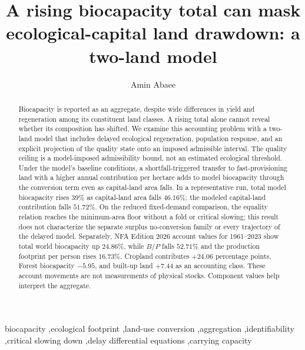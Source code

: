 \documentclass[preprint,12pt,authoryear]{elsarticle}
\begin{document}
\begin{frontmatter}

\title{A rising biocapacity total can mask ecological-capital land drawdown: a two-land model}

\author[1]{Amin Abaee}

\begin{abstract}
Biocapacity is reported as an aggregate, despite wide differences in yield and regeneration among its constituent land classes. A rising total alone cannot reveal whether its composition has shifted. We examine this accounting problem with a two-land model that includes delayed ecological regeneration, population response, and an explicit projection of the quality state onto an imposed admissible interval. The quality ceiling is a model-imposed admissibility bound, not an estimated ecological threshold. Under the model's baseline conditions, a shortfall-triggered transfer to fast-provisioning land with a higher annual contribution per hectare adds to model biocapacity through the conversion term even as capital-land area falls. In a representative run, total model biocapacity rises $39\%$ as capital-land area falls $46.16\%$; the modeled capital-land contribution falls $51.72\%$. On the reduced fixed-demand comparison, the equality relation reaches the minimum-area floor without a fold or critical slowing; this result does not characterize the separate surplus no-conversion family or every trajectory of the delayed model. Separately, NFA Edition 2026 account values for 1961--2023 show total world biocapacity up $24.86\%$, while $B/P$ falls $52.71\%$ and the production footprint per person rises $16.73\%$. Cropland contributes $+24.06$ percentage points, Forest biocapacity $-5.95$, and built-up land $+7.44$ as an accounting class. These account movements are not measurements of physical stocks. Component values help interpret the aggregate.

\end{abstract}

\begin{keyword}
\footnotesize
biocapacity \sep ecological footprint \sep land-use conversion \sep aggregation \sep identifiability \sep critical slowing down \sep delay differential equations \sep carrying capacity
\end{keyword}

\end{frontmatter}
\end{document}
